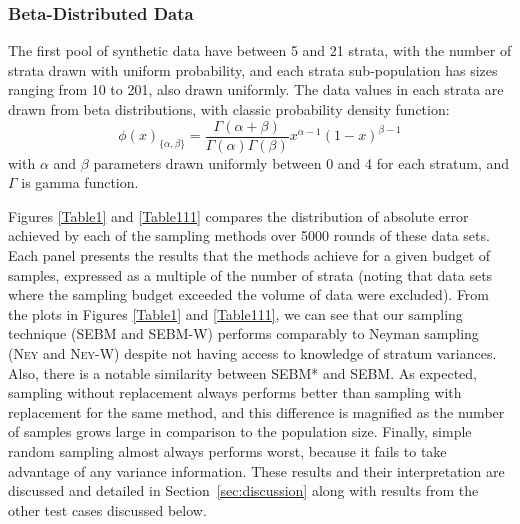 \subsubsection{Beta-Distributed Data}\label{sec:beta_distributed_data}
The first pool of synthetic data %
have between 5 and 21 strata, with the number of strata drawn with uniform probability, 
and each strata sub-population has sizes ranging from 10 to 201, also drawn uniformly.
The data values in each strata are drawn from beta distributions, with classic probability density function:
$$\phi(x)_{\{\alpha,\beta\}}
=\frac{\Gamma(\alpha+\beta)}{\Gamma(\alpha)\Gamma(\beta)}     
    x^{\alpha-1}(1-x)^{\beta-1} $$
with $\alpha$ and $\beta$ parameters drawn uniformly between 0 and 4 for each stratum, and $\Gamma$ is gamma function.










Figures \ref{Table1} and \ref{Table111} compares the distribution of absolute error achieved by each of the sampling methods over 5000 rounds of these data sets.
Each panel presents the results that the methods achieve for a given budget of samples, 
expressed as a multiple of the number of strata (noting that data sets where the sampling budget exceeded the volume of data were excluded).
From the plots in Figures \ref{Table1} and \ref{Table111}, we can see that our sampling technique (SEBM and SEBM-W) performs comparably to
Neyman sampling (\textsc{Ney} and \textsc{Ney-W}) despite not having access to knowledge of stratum variances.
Also, there is a notable similarity between SEBM* and SEBM.
As expected, sampling without replacement always performs better than sampling with replacement for the same method, and this difference is magnified as the number of samples grows large in comparison to the population size. 
Finally, simple random sampling almost always performs worst, because it fails to take advantage of any variance information.
These results and their interpretation are discussed and detailed in Section~\ref{sec:discussion} along with results from the other test cases discussed below.




